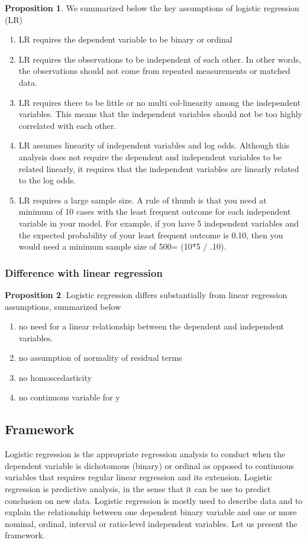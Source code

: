 \documentclass[a4paper]{article}
\theoremstyle{definition}
\theoremstyle{proposition}
\newtheorem{proposition}{Proposition}[section]
\begin{document}
\begin{proposition}
We summarized below the key assumptions of logistic regression (LR)
\begin{enumerate}
\item LR requires the dependent variable to be binary or ordinal 
\item LR  requires the observations to be independent of each other.  In other words, the observations should not come from repeated measurements or matched data.
\item LR  requires there to be little or no multi col-linearity among the independent variables.  This means that the independent variables should not be too highly correlated with each other.
\item  LR  assumes linearity of independent variables and log odds.  Although this analysis does not require the dependent and independent variables to be related linearly, it requires that the independent variables are linearly related to the log odds.
\item LR requires a large sample size.  A rule of thumb is that you need at minimum of 10 cases with the least frequent outcome for each independent variable in your model. 
For example, if you have 5 independent variables and the expected probability of your least frequent outcome is 0.10, then you would need a minimum sample size of 500= (10*5 / .10).
\end{enumerate}
\end{proposition}

\subsubsection{Difference with linear regression}
\begin{proposition}
Logistic regression differs substantially from linear regression assumptions, summarized below
\begin{enumerate}
\item no need for a linear relationship between the dependent and independent variables.  
\item no assumption of normality of residual terms
\item no homoscedasticity 
\item no continuous variable for y
\end{enumerate}
\end{proposition}


\subsection{Framework}
Logistic regression is the appropriate regression analysis to conduct when the dependent variable is dichotomous (binary) or ordinal as opposed to continuous variables that requires regular linear regression and its extension. Logistic regression is predictive analysis, in the sense that it can be use to predict conclusion on new data. Logistic regression is mostly used to describe data and to explain the relationship between one dependent binary variable and one or more nominal, ordinal, interval or ratio-level independent variables. Let us present the framework.
\end{document}
